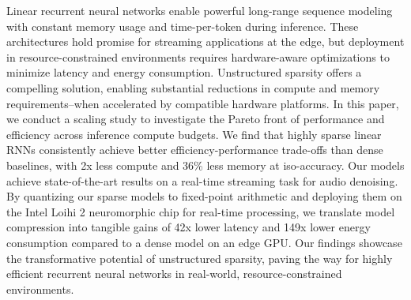 Linear recurrent neural networks enable powerful long-range sequence modeling with constant memory usage and time-per-token during inference. These architectures hold promise for streaming applications at the edge, but deployment in resource-constrained environments requires hardware-aware optimizations to minimize latency and energy consumption. 
Unstructured sparsity offers a compelling solution, enabling substantial reductions in compute and memory requirements--when accelerated by compatible hardware platforms. 
In this paper, we conduct a scaling study to investigate the Pareto front of performance and efficiency across inference compute budgets.
We find that highly sparse linear RNNs consistently achieve better efficiency-performance trade-offs than dense baselines, with 2x less compute and 36\% less memory at iso-accuracy.
Our models achieve state-of-the-art results on a real-time streaming task for audio denoising.
By quantizing our sparse models to fixed-point arithmetic and deploying them on the Intel Loihi 2 neuromorphic chip for real-time processing, we translate model compression into tangible gains of 42x lower latency and 149x lower energy consumption compared to a dense model on an edge GPU.
Our findings showcase the transformative potential of unstructured sparsity, paving the way for highly efficient recurrent neural networks in real-world, resource-constrained environments. 
